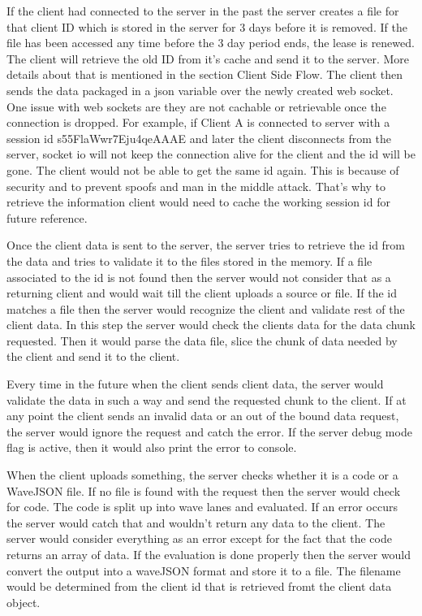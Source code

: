 \documentclass[14pt]{extarticle}
\begin{document}
\par If the client had connected to the server in the past the server creates a file for that client ID which is stored in the server for 3 days before it is removed. If the file has been accessed any time before the 3 day period ends, the lease is renewed. The client will retrieve the old ID from it's cache and send it to the server. More details about that is mentioned in the section Client Side Flow. The client then sends the data packaged in a json variable over the newly created web socket. One issue with web sockets are they are not cachable or retrievable once the connection is dropped. For example, if Client A is connected to server with a session id s55FlaWwr7Eju4qeAAAE and later the client disconnects from the server, socket io will not keep the connection alive for the client and the id will be gone. The client would not be able to get the same id again. This is because of security and to prevent spoofs and man in the middle attack. That's why to retrieve the information client would need to cache the working session id for future reference. 
\par Once the client data is sent to the server, the server tries to retrieve the id from the data and tries to validate it to the files stored in the memory. If a file associated to the id is not found then the server would not consider that as a returning client and would wait till the client uploads a source or file. If the id matches a file then the server would recognize the client and validate rest of the client data. In this step the server would check the clients data for the data chunk requested. Then it would parse the data file, slice the chunk of data needed by the client and send it to the client. 

\par Every time in the future when the client sends client data, the server would validate the data in such a way and send the requested chunk to the client. If at any point the client sends an invalid data or an out of the bound data request, the server would ignore the request and catch the error. If the server debug mode flag is active, then it would also print the error to console.

\par When the client uploads something, the server checks whether it is a code or a WaveJSON file. If no file is found with the request then the server would check for code. The code is split up into wave lanes and evaluated. If an error occurs the server would catch that and wouldn't return any data to the client. The server would consider everything as an error except for the fact that the code returns an array of data. If the evaluation is done properly then the server would convert the output into a waveJSON format and store it to a file. The filename would be determined from the client id that is retrieved fromt the client data object.
\end{document}
